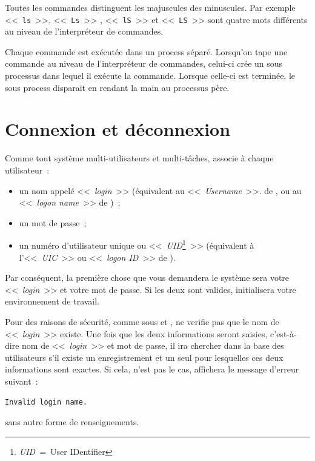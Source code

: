 Toutes les commandes {\Unix} distinguent les majuscules des
minuscules. Par exemple <<~{\tt ls}~>>, <<~{\tt Ls}~>> , <<~{\tt lS}~>>
et <<~{\tt LS}~>> sont quatre mots diff{\'e}rents au niveau de
l'interpr{\'e}teur de commandes.

Chaque commande {\Unix} est ex{\'e}cut{\'e}e dans un process
s{\'e}par{\'e}. Lorsqu'on tape une commande au niveau de
l'interpr{\'e}teur de commandes, celui-ci cr{\'e}e un sous processus dans
lequel il ex{\'e}cute la commande. Lorsque celle-ci est termin{\'e}e, le
sous process disparait en rendant la main au processus p{\`e}re.

\section{\label{bcpts-login}Connexion et d{\'e}connexion}

Comme tout syst{\`e}me multi-utilisateurs et multi-t{\^a}ches, {\Unix} associe
{\`a} chaque utilisateur~:
\begin{itemize}
	\item	un nom appel{\'e} <<~{\sl login}~>>
			({\'e}quivalent au <<~{\sl Username}~>>.
			de {\OpenVMS}, ou au <<~{\sl logon name}~>> de {\WindowsNT})~;
	\item	un mot de passe~;
	\item	un num{\'e}ro d'utilisateur unique ou 
			<<~{\sl UID}\footnote{{\sl UID}~=~User IDentifier}~>> ({\'e}quivalent
			{\`a} l'<<~{\sl UIC}~>> {\OpenVMS} ou <<~{\sl logon ID}~>> de
			{\WindowsNT}).
\end{itemize}

Par cons{\'e}quent, la premi{\`e}re chose que vous demandera le syst{\`e}me sera
votre <<~{\sl login}~>> et votre mot de passe. Si les deux sont valides,
{\Unix} initialisera votre environnement de travail.

\begin{remarque}
Pour des raisons de s{\'e}curit{\'e}, comme sous {\OpenVMS} et
{\WindowsNT}, {\Unix} ne verifie pas que le nom de <<~{\sl login}~>>
existe. Une fois que les deux informations seront saisies,
c'est-{\`a}-dire nom de <<~{\sl login}~>> et mot de passe, il ira
chercher dans la base des utilisateurs s'il existe un enregistrement et
un seul pour lesquelles ces deux informations sont exactes. Si cela,
n'est pas le cas, {\Unix} affichera le message d'erreur suivant~:
\begin{center}
\begin{verbatim}
Invalid login name.
\end{verbatim}
\end{center}
sans autre forme de renseignements.
\end{remarque}

